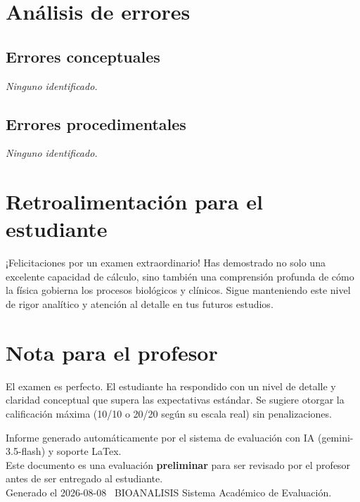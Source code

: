 \documentclass[11pt,a4paper]{article}
\begin{document}
\section*{Análisis de errores}

\subsection*{Errores conceptuales}
\textit{Ninguno identificado.}

\subsection*{Errores procedimentales}
\textit{Ninguno identificado.}

\section*{Retroalimentación para el estudiante}
\begin{tcolorbox}[cajaRecomendacion, title={Dirigido a: Rosmeilys Sucre}]
¡Felicitaciones por un examen extraordinario! Has demostrado no solo una excelente capacidad de cálculo, sino también una comprensión profunda de cómo la física gobierna los procesos biológicos y clínicos. Sigue manteniendo este nivel de rigor analítico y atención al detalle en tus futuros estudios.
\end{tcolorbox}

\section*{Nota para el profesor}
\begin{tcolorbox}[
  enhanced, breakable,
  colback=yellow!8, colframe=yellow!60!black,
  fonttitle=\bfseries, coltitle=black,
  title={Observaciones para revisión manual},
  top=4pt, bottom=4pt, left=8pt, right=8pt,
]
El examen es perfecto. El estudiante ha respondido con un nivel de detalle y claridad conceptual que supera las expectativas estándar. Se sugiere otorgar la calificación máxima (10/10 o 20/20 según su escala real) sin penalizaciones.
\end{tcolorbox}

\vspace{12pt}
\begin{center}
  \footnotesize\color{gray}
  Informe generado automáticamente por el sistema de evaluación con IA (gemini-3.5-flash) y soporte LaTex. \\
  Este documento es una evaluación \textbf{preliminar} para ser revisado por el profesor antes de ser entregado al 
  estudiante. \\
  Generado el 2026-08-08 \textbullet\ BIOANALISIS Sistema Académico de Evaluación.
  \end{center}
\end{document}
